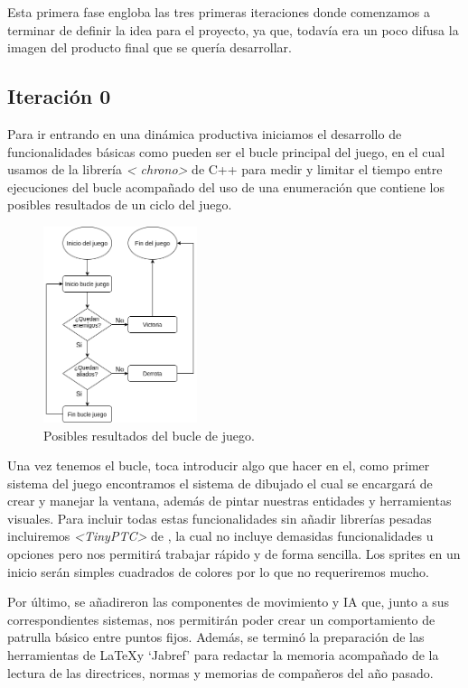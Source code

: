 Esta primera fase engloba las tres primeras iteraciones donde comenzamos a terminar de definir 
la idea para el proyecto, ya que, todavía era un poco difusa la imagen del producto final que se
quería desarrollar.

\subsection*{Iteración 0}
Para ir entrando en una dinámica productiva iniciamos el desarrollo de funcionalidades básicas 
como pueden ser el bucle principal del juego, en el cual usamos de la librería \textit{\textless
chrono\textgreater} de C++ para medir y limitar el tiempo entre ejecuciones del bucle acompañado del uso 
de una enumeración que contiene los posibles resultados de un ciclo del juego.

\begin{figure}[htb]
\centering
\includegraphics[width=0.4\textwidth]{imagenes/diario_desarrollo/Loop_juego.png}
\caption{Posibles resultados del bucle de juego.}
\label{fig:game_loop}
\end{figure} 

Una vez tenemos el bucle, toca introducir algo que hacer en el, como primer sistema del juego
encontramos el sistema de dibujado el cual se encargará de crear y manejar la ventana, además
de pintar nuestras entidades y herramientas visuales. Para incluir todas estas funcionalidades
sin añadir librerías pesadas incluiremos \textit{\textless TinyPTC\textgreater} de \newline
\citeauthor*{tinyptc2019}, la cual no 
incluye demasidas funcionalidades u opciones pero nos permitirá trabajar rápido y de forma 
sencilla. Los sprites en un inicio serán simples cuadrados de colores por lo que no requeriremos 
mucho.

Por último, se añadireron las componentes de movimiento y \ac{IA} que, junto a sus correspondientes
sistemas, nos permitirán poder crear un comportamiento de patrulla básico entre puntos fijos.
Además, se terminó la preparación de las herramientas de \LaTeX y `Jabref' para redactar la 
memoria acompañado de la lectura de las directrices, normas y memorias de compañeros del año 
pasado.

